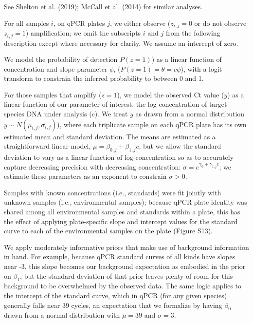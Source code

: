 \documentclass[
]{article}
\begin{document}
See Shelton et al. (2019); McCall et al. (2014) for similar analyses.

For all samples \(i\), on qPCR plates \(j\), we either observe
(\(z_{i,j} = 0\) or do not observe \(z_{i,j} = 1\)) amplification; we
omit the subscripts \(i\) and \(j\) from the following description
except where necessary for clarity. We assume an intercept of zero.

We model the probability of detection \(P(z = 1)\)) as a linear function
of concentration and slope parameter \(\phi\),
(\(P(z = 1) = \theta = c\phi\)), with a logit transform to constrain the
inferred probability to between 0 and 1.

For those samples that amplify (\(z = 1\)), we model the observed Ct
value (\(y\)) as a linear function of our parameter of interest, the
log-concentration of target-species DNA under analysis (\(c\)). We treat
\(y\) as drawn from a normal distribution
\(y \sim N(\mu_{i,j}, \sigma_{i,j})\)), where each triplicate sample on
each qPCR plate has its own estimated mean and standard deviation. The
means are estimated as a straightforward linear model,
\(\mu = \beta_{0,j} + \beta_{1,j}c\), but we allow the standard
deviation to vary as a linear function of log-concentration so as to
accurately capture decreasing precision with decreasing concentration:
\(\sigma = e^{\gamma_{0} + \gamma_{1,j}c}\); we estimate these
parameters as an exponent to constrain \(\sigma > 0\).

Samples with known concentrations (i.e., standards) were fit jointly
with unknown samples (i.e., environmental samples); because qPCR plate
identity was shared among all environmental samples and standards within
a plate, this has the effect of applying plate-specific slope and
intercept values for the standard curve to each of the environmental
samples on the plate (Figure S13).

We apply moderately informative priors that make use of background
information in hand. For example, because qPCR standard curves of all
kinds have slopes near -3, this slope becomes our background expectation
as embodied in the prior on \(\beta_1\), but the standard deviation of
that prior leaves plenty of room for this background to be overwhelmed
by the observed data. The same logic applies to the intercept of the
standard curve, which in qPCR (for any given species) generally falls
near 39 cycles, an expectation that we formalize by having \(\beta_0\)
drawn from a normal distribution with \(\mu = 39\) and \(\sigma = 3\).
\end{document}
